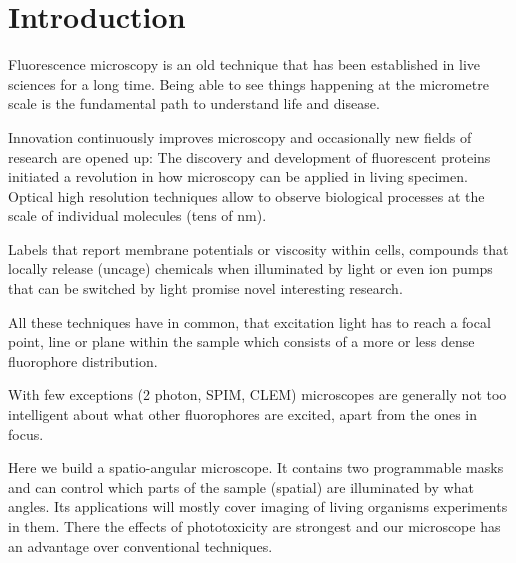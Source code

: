 \chapter{Introduction}
Fluorescence microscopy is an old technique that has been established
in live sciences for a long time. Being able to see things happening
at the micrometre scale is the fundamental path to understand life and
disease.

Innovation continuously improves microscopy and occasionally new
fields of research are opened up: The discovery and development of
fluorescent proteins initiated a revolution in how microscopy can be
applied in living specimen. Optical high resolution techniques allow
to observe biological processes at the scale of individual molecules
(tens of nm). 

Labels that report membrane potentials or viscosity within cells,
compounds that locally release (uncage) chemicals when illuminated by
light or even ion pumps that can be switched by light promise novel
interesting research.

All these techniques have in common, that excitation light has to
reach a focal point, line or plane within the sample which consists of
a more or less dense fluorophore distribution.

With few exceptions (2 photon, SPIM, CLEM) microscopes are generally not too
intelligent about what other fluorophores are excited, apart from the
ones in focus.

Here we build a spatio-angular microscope. It contains two
programmable masks and can control which parts of the sample (spatial)
are illuminated by what angles. Its applications will mostly cover
imaging of living organisms experiments in them. There the effects of
phototoxicity are strongest and our microscope has an advantage over
conventional techniques.
